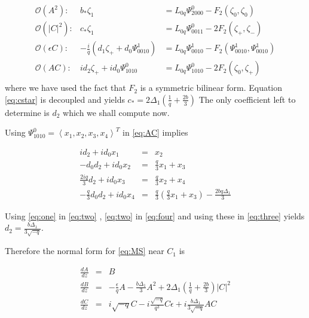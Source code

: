 \begin{subequations}
\begin{eqnarray}
\mathcal{O}(A^2): &		b_* \zeta_1 &= L_{0q} \Psi_{2000}^0 - F_2(\zeta_0,\zeta_0) \\
\mathcal{O}(\left|C\right|^2):&	c_* \zeta_1 &= L_{0q} \Psi_{0011}^0 -2 F_2(\zeta_+,\zeta_-) \label{eq:cstar} \\
\mathcal{O}(\epsilon C): &-\frac{i}{q} \left(d_1 \zeta_+ +  d_0 \Psi_{0010}^1\right) &= L_{0q} \Psi_{0010}^1 - F_2(\Psi_{0010}^1,\Psi_{0010}^1) \\
\mathcal{O}(A C): 	&i d_2 \zeta_+ + i d_0 \Psi_{1010}^0 &= L_{0q} \Psi_{1010}^0 - 2 F_2(\zeta_0,\zeta_+) \\ \label{eq:AC}
\end{eqnarray}
\end{subequations}
where we have used the fact that $F_2$ is a symmetric bilinear form. Equation \eqref{eq:cstar} is decoupled and yields 
$ c_* = 2 \Delta_1 \left(\frac{1}{q} + \frac{2 b}{3} \right)$ The only coefficient left to determine is $d_2$ which we shall compute now. 

Using $\Psi_{1010}^0 = \left<x_1,x_2,x_3,x_4\right>^T$ in \eqref{eq:AC} implies 

\begin{subequations}
\begin{eqnarray}
i d_2 + i d_0 x_1 &=& x_2 \label{eq:one} \\
- d_0 d_2 + i d_0 x_2 &=& \frac{q}{3} x_1 + x_3 \label{eq:two} \\
\frac{2 i q}{3} d_2 + i d_0 x_3 &=& \frac{q}{3} x_2 + x_4  \label{eq:three} \\
- \frac{q}{3} d_0 d_2 + i d_0 x_4 &=& \frac{q}{3}\left(\frac{q}{3} x_1 + x_3 \right) - \frac{ 2 b q \Delta_1} {3} \label{eq:four}
\end{eqnarray}
\end{subequations}

Using \eqref{eq:one} in \eqref{eq:two} , \eqref{eq:two} in \eqref{eq:four} and using these in \eqref{eq:three} yields $ d_2 = \frac{ b \Delta_1 }{ 3 \sqrt{-q} } $.

Therefore the normal form for \eqref{eq:MS} near $C_1$ is 

\begin{subequations}
\begin{eqnarray}
\frac{dA}{dz} &=& B \\ \label{eq:normalA}
\frac{dB}{dz} &=& -\frac{\epsilon}{q} A - \frac{b \Delta_1 }{3} A^2 + 2 \Delta_1 \left(\frac{1}{q} + \frac{2 b }{3} \right) \left|C\right|^2 \\ \label{eq:normalB}
\frac{dC}{dz} &=& i \sqrt{-q} C - i \frac{\sqrt{-q} }{q^3} C\epsilon + i \frac{b \Delta_1}{3 \sqrt{-q}} A C \label{eq:normalC}
\end{eqnarray}
\end{subequations}
